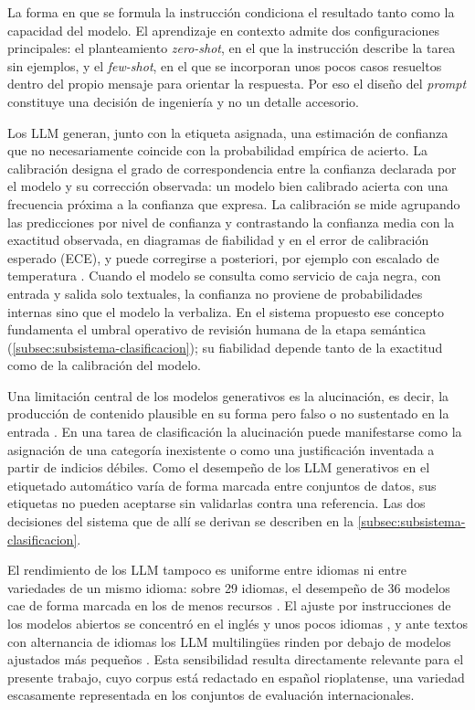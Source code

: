 La forma en que se formula la instrucción condiciona el resultado tanto como la capacidad del modelo. El aprendizaje en contexto admite dos configuraciones principales: el planteamiento \emph{zero-shot}, en el que la instrucción describe la tarea sin ejemplos, y el \emph{few-shot}, en el que se incorporan unos pocos casos resueltos dentro del propio mensaje para orientar la respuesta. Por eso el diseño del \emph{prompt} constituye una decisión de ingeniería y no un detalle accesorio.

Los LLM generan, junto con la etiqueta asignada, una estimación de confianza que no necesariamente coincide con la probabilidad empírica de acierto. La calibración designa el grado de correspondencia entre la confianza declarada por el modelo y su corrección observada: un modelo bien calibrado acierta con una frecuencia próxima a la confianza que expresa. La calibración se mide agrupando las predicciones por nivel de confianza y contrastando la confianza media con la exactitud observada, en diagramas de fiabilidad y en el error de calibración esperado (ECE), y puede corregirse a posteriori, por ejemplo con escalado de temperatura \parencite{Guo2017_calibration}. Cuando el modelo se consulta como servicio de caja negra, con entrada y salida solo textuales, la confianza no proviene de probabilidades internas sino que el modelo la verbaliza. En el sistema propuesto ese concepto fundamenta el umbral operativo de revisión humana de la etapa semántica (\autoref{subsec:subsistema-clasificacion}); su fiabilidad depende tanto de la exactitud como de la calibración del modelo.

Una limitación central de los modelos generativos es la alucinación, es decir, la producción de contenido plausible en su forma pero falso o no sustentado en la entrada \parencite{Ji2023_hallucination}. En una tarea de clasificación la alucinación puede manifestarse como la asignación de una categoría inexistente o como una justificación inventada a partir de indicios débiles. Como el desempeño de los LLM generativos en el etiquetado automático varía de forma marcada entre conjuntos de datos, sus etiquetas no pueden aceptarse sin validarlas contra una referencia. Las dos decisiones del sistema que de allí se derivan se describen en la \autoref{subsec:subsistema-clasificacion}.

El rendimiento de los LLM tampoco es uniforme entre idiomas ni entre variedades de un mismo idioma: sobre 29 idiomas, el desempeño de 36 modelos cae de forma marcada en los de menos recursos \parencite{xuan2025mmluprox}. El ajuste por instrucciones de los modelos abiertos se concentró en el inglés y unos pocos idiomas \parencite{lai2023okapi}, y ante textos con alternancia de idiomas los LLM multilingües rinden por debajo de modelos ajustados más pequeños \parencite{zhang2023multilingual}. Esta sensibilidad resulta directamente relevante para el presente trabajo, cuyo corpus está redactado en español rioplatense, una variedad escasamente representada en los conjuntos de evaluación internacionales.

